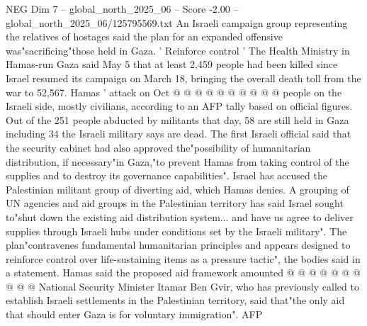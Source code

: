 \begin{textsample}{NEG Dim 7 – global\_north\_2025\_06 – Score -2.00 – global\_north\_2025\_06/125795569.txt}
An Israeli campaign group representing the relatives of hostages said the plan for an expanded offensive was"sacrificing"those held in Gaza. ' Reinforce control ' The Health Ministry in Hamas-run Gaza said May 5 that at least 2,459 people had been killed since Israel resumed its campaign on March 18, bringing the overall death toll from the war to 52,567.
Hamas ' attack on Oct @ @ @ @ @ @ @ @ @ @ people on the Israeli side, mostly civilians, according to an AFP tally based on official figures.
Out of the 251 people abducted by militants that day, 58 are still held in Gaza including 34 the Israeli military says are dead.
The first Israeli official said that the security cabinet had also approved the"possibility of humanitarian distribution, if necessary"in Gaza,"to prevent Hamas from taking control of the supplies and to destroy its governance capabilities".
Israel has accused the Palestinian militant group of diverting aid, which Hamas denies.
A grouping of UN agencies and aid groups in the Palestinian territory has said Israel sought to"shut down the existing aid distribution system... and have us agree to deliver supplies through Israeli hubs under conditions set by the Israeli military".
The plan"contravenes fundamental humanitarian principles and appears designed to reinforce control over life-sustaining items as a pressure tactic", the bodies said in a statement.
Hamas said the proposed aid framework amounted @ @ @ @ @ @ @ @ @ @ National Security Minister Itamar Ben Gvir, who has previously called to establish Israeli settlements in the Palestinian territory, said that"the only aid that should enter Gaza is for voluntary immigration".
AFP

\end{textsample}

